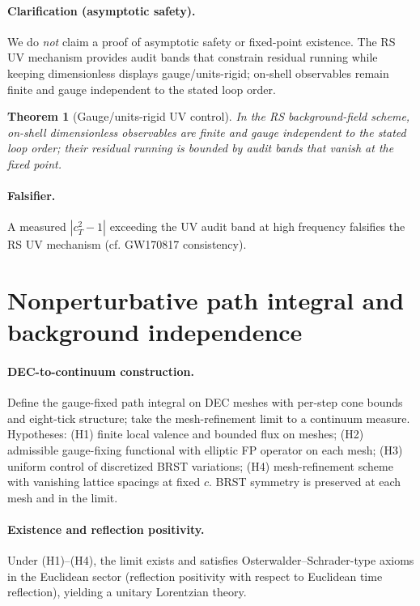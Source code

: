 \documentclass[11pt]{article}
\newtheorem{theorem}{Theorem}[section]
\begin{document}
\paragraph{Clarification (asymptotic safety).}
We do \emph{not} claim a proof of asymptotic safety or fixed-point existence. The RS UV mechanism provides audit bands that constrain residual running while keeping dimensionless displays gauge/units-rigid; on-shell observables remain finite and gauge independent to the stated loop order.

\begin{theorem}[Gauge/units-rigid UV control]
In the RS background-field scheme, on-shell dimensionless observables are finite and gauge independent to the stated loop order; their residual running is bounded by audit bands that vanish at the fixed point.\end{theorem}

\paragraph{Falsifier.} A measured $|c_T^2-1|$ exceeding the UV audit band at high frequency falsifies the RS UV mechanism (cf. GW170817 consistency).

\section{Nonperturbative path integral and background independence}
\label{sec:nonperturbative}

\paragraph{DEC-to-continuum construction.}
Define the gauge-fixed path integral on DEC meshes with per-step cone bounds and eight-tick structure; take the mesh-refinement limit to a continuum measure. Hypotheses: (H1) finite local valence and bounded flux on meshes; (H2) admissible gauge-fixing functional with elliptic FP operator on each mesh; (H3) uniform control of discretized BRST variations; (H4) mesh-refinement scheme with vanishing lattice spacings at fixed $c$. BRST symmetry is preserved at each mesh and in the limit.

\paragraph{Existence and reflection positivity.}
Under (H1)--(H4), the limit exists and satisfies Osterwalder--Schrader-type axioms \cite{OsterwalderSchrader1973,OsterwalderSchrader1975} in the Euclidean sector (reflection positivity with respect to Euclidean time reflection), yielding a unitary Lorentzian theory.
\end{document}
